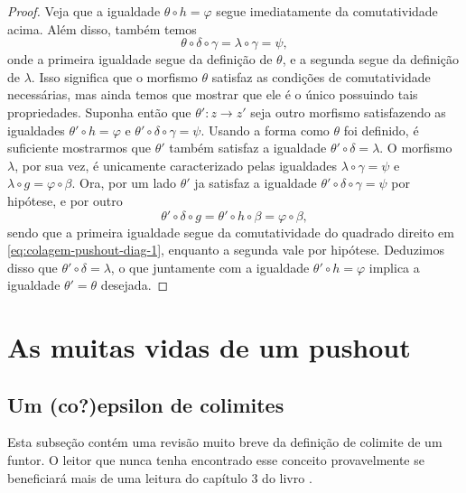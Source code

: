 \begin{proof}
   Veja que a igualdade $\theta \circ h = \varphi$ segue imediatamente da comutatividade acima.
   Além disso, também temos
   \begin{displaymath}
     \theta \circ \delta \circ \gamma
     = \lambda \circ \gamma
     = \psi,
   \end{displaymath}
   onde a primeira igualdade segue da definição de $\theta$, e a segunda segue da definição de $\lambda$.
   Isso significa que o morfismo $\theta$ satisfaz as condições de comutatividade necessárias, mas ainda temos que mostrar que ele é o único possuindo tais propriedades.
   Suponha então que $\theta': z \to z'$ seja outro morfismo satisfazendo as igualdades $\theta' \circ h = \varphi$ e $\theta' \circ \delta \circ \gamma = \psi$.
   Usando a forma como $\theta$ foi definido, é suficiente mostrarmos que $\theta'$ também satisfaz a igualdade $\theta' \circ \delta = \lambda$.
   O morfismo $\lambda$, por sua vez, é unicamente caracterizado pelas igualdades $\lambda \circ \gamma = \psi$ e $\lambda \circ g = \varphi \circ \beta$.
   Ora, por um lado $\theta'$ ja satisfaz a igualdade $\theta' \circ \delta \circ \gamma = \psi$ por hipótese, e por outro
   \begin{displaymath}
     \theta' \circ \delta \circ g = \theta' \circ h \circ \beta = \varphi \circ \beta,
   \end{displaymath}
   sendo que a primeira igualdade segue da comutatividade do quadrado direito em \eqref{eq:colagem-pushout-diag-1}, enquanto a segunda vale por hipótese.
   Deduzimos disso que $\theta' \circ \delta = \lambda$, o que juntamente com a igualdade $\theta' \circ h = \varphi$ implica a igualdade $\theta' = \theta$ desejada.
 \end{proof}

\section{As muitas vidas de um pushout}
\label{sec:vidas_pushout}

\subsection{Um (co?)epsilon de colimites}
\label{sec:revisao_colimites}

Esta subseção contém uma revisão muito breve da definição de colimite de um funtor.
O leitor que nunca tenha encontrado esse conceito provavelmente se beneficiará  mais de uma leitura do capítulo 3 do livro \cite{cat_riehl}.

